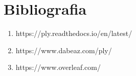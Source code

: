 \chapter{Bibliografia}

\begin{enumerate}
    \item https://ply.readthedocs.io/en/latest/
    \item https://www.dabeaz.com/ply/
    \item https://www.overleaf.com/
\end{enumerate}
